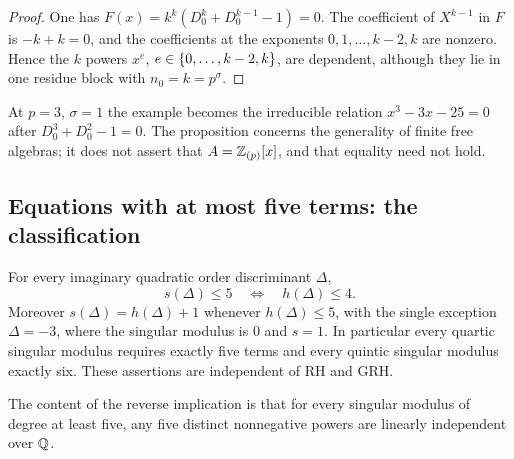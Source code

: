
\begin{proof}
One has $F(x)=k^k(D_0^k+D_0^{k-1}-1)=0$. The coefficient of $X^{k-1}$ in $F$ is
$-k+k=0$, and the coefficients at the exponents $0,1,\dots,k-2,k$ are nonzero. Hence
the $k$ powers $x^e$, $e\in\{0,\dots,k-2,k\}$, are dependent, although they lie in one
residue block with $n_0=k=p^\sigma$.
\end{proof}

At $p=3$, $\sigma=1$ the example becomes the irreducible relation $x^3-3x-25=0$ after
$D_0^3+D_0^2-1=0$. The proposition concerns the generality of finite free algebras; it
does not assert that $A=\mathbb{Z}_{(p)}[x]$, and that equality need not hold.

\subsection{Equations with at most five terms: the classification}\label{smd:sec:classification}
{\raggedright{}}

\begin{theorem}\label{smd:thm:five}
For every imaginary quadratic order discriminant $\Delta$,
\[
 s(\Delta)\le5\quad\Longleftrightarrow\quad h(\Delta)\le4 .
\]
Moreover $s(\Delta)=h(\Delta)+1$ whenever $h(\Delta)\le5$, with the single exception
$\Delta=-3$, where the singular modulus is $0$ and $s=1$. In particular every quartic
singular modulus requires exactly five terms and every quintic singular modulus exactly
six. These assertions are independent of RH and GRH.
\end{theorem}

The content of the reverse implication is that for every singular modulus of degree at
least five, any five distinct nonnegative powers are linearly independent over $\mathbb{Q}$.

